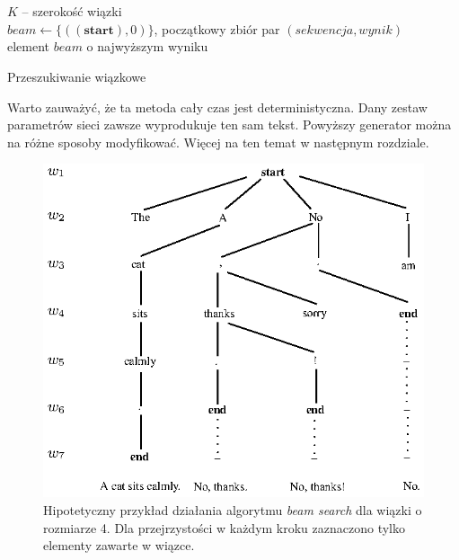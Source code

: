 \begin{algorithm}[h]
    \\\\$K$ -- szerokość wiązki\\[5pt]
    $beam \gets \{((\mathbf{start}), 0)\}$, początkowy zbiór par $(sekwencja, wynik)$\\
    \Return element $beam$ o najwyższym wyniku
    \caption{Przeszukiwanie wiązkowe}
\end{algorithm}

Warto zauważyć, że ta metoda cały czas jest deterministyczna. Dany zestaw parametrów sieci zawsze wyprodukuje ten sam tekst. Powyższy generator można na różne sposoby modyfikować. Więcej na ten temat w następnym rozdziale.

\begin{figure}[H]
  \centering
    \includegraphics[width=\textwidth]{chapter2/img/bs.eps}
  \caption{\small{Hipotetyczny przykład działania algorytmu \textit{beam search} dla wiązki o rozmiarze 4. Dla przejrzystości w każdym kroku zaznaczono tylko elementy zawarte w wiązce.}}
\end{figure}
